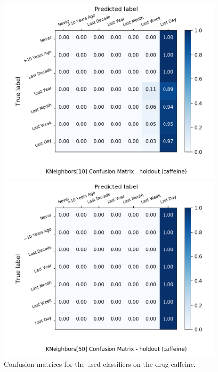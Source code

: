 \begin{figure}[H]
\begin{minipage}[b]{0.32\textwidth}
		\includegraphics[width=1.1\textwidth]{Plots/drugs/caffeine_KNeighbors_10_balance_False_holdout.png}
  \end{minipage}
	\begin{minipage}[b]{0.32\textwidth}
		\includegraphics[width=1.1\textwidth]{Plots/drugs/caffeine_KNeighbors_50_balance_False_holdout.png}
  \end{minipage}
	\caption{Confusion matrices for the used classifiers on the drug caffeine.}
\end{figure}


